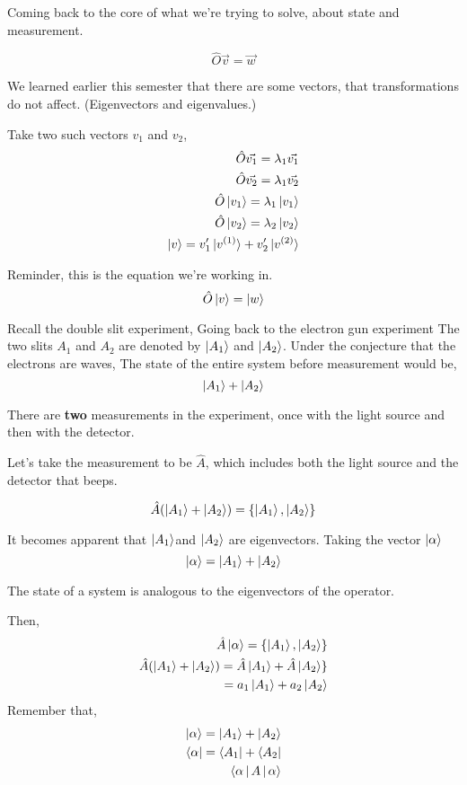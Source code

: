 \documentclass{report}
\begin{document}
Coming back to the core of what we're trying to solve, about state and measurement.

$$\hat{O}\vec{v} = \vec{w}$$

We learned earlier this semester that there are some vectors, that transformations do not affect. (Eigenvectors and eigenvalues.)

Take two such vectors $v_1$ and $v_2$,
\begin{align*}
\hat{O}\vec{v_1} = \lambda_1 \vec{v_1} \\
\hat{O}\vec{v_2} = \lambda_1 \vec{v_2} \\
\hat{O}\ket{v_1} = \lambda_1 \ket{v_1} \\
\hat{O}\ket{v_2} = \lambda_2 \ket{v_2} \\
\ket{v} = v_1' \ket{v^{(1)}}+v_2' \ket{v^{(2)}} \\
\end{align*}

Reminder, this is the equation we're working in.
$$\hat{O}\ket{v}=\ket{w}$$

Recall the double slit  experiment, Going back to the electron gun experiment The two slits $A_1$ and $A_2$ are denoted by $\ket{A_1}$ and $\ket{A_2}$. Under the conjecture that the electrons are waves, The state of the entire system before measurement would be,
$$\ket{A_1} + \ket{A_2}$$ 

There are \textbf{two} measurements in the experiment, once with the light source and then with the detector.

Let's take the measurement to be $\hat{A}$, which includes both the light source and the detector that beeps.

$$\hat{A}(\ket{A_1} + \ket{A_2}) = \{\ket{A_1}, \ket{A_2}\}$$

It becomes apparent that $\ket{A_1}$and $\ket{A_2}$ are eigenvectors. Taking the vector $\ket{\alpha}$ $$\ket{\alpha} = \ket{A_1}+\ket{A_2}$$

The state of a system is analogous to the eigenvectors of the operator.

Then,
\begin{align*}
\hat{A}\ket{\alpha} = \{\ket{A_1}, \ket{A_2}\} \\
\hat{A}(\ket{A_1} + \ket{A_2}) = \hat{A}\ket{A_1} + \hat{A} \ket{A_2}\} \\
=a_1 \ket{A_1} + a_2 \ket{A_2} \\
\end{align*}
Remember that,
\begin{align*}
\ket{\alpha} = \ket{A_1} + \ket{A_2} \\
\bra{\alpha} = \bra{A_1}+\bra{A_2} \\
\Braket{\alpha | A | \alpha} \\
\end{align*}
\end{document}
